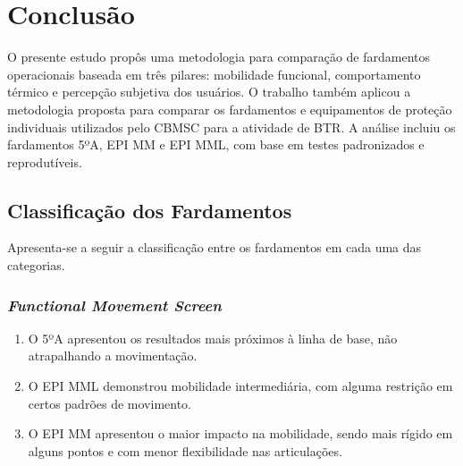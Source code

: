 \chapter{Conclusão}
    O presente estudo propôs uma metodologia para comparação de fardamentos operacionais baseada 
    em três pilares: mobilidade funcional, comportamento térmico e percepção subjetiva dos usuários.
    O trabalho também aplicou a metodologia proposta para comparar os fardamentos e equipamentos de 
    proteção individuais utilizados pelo \acrshort{CBMSC} para a atividade de \acrlong{BTR}. A análise incluiu os fardamentos 5ºA, 
    EPI \acrlong{MM} e EPI \acrlong{MML}, com base em testes padronizados e reprodutíveis.
    
    \section{Classificação dos Fardamentos}
        Apresenta-se a seguir a classificação entre os fardamentos em cada uma das categorias.
        \subsection{\textit{Functional Movement Screen}}
            \begin{enumerate}[label=\Roman*.] %
                \item O 5ºA apresentou os resultados mais próximos à linha de base, não atrapalhando a 
                movimentação.
                \item O \acrshort{EPI} \acrlong{MML} demonstrou mobilidade intermediária, com alguma
                restrição em certos padrões de movimento.
                \item O \acrshort{EPI} \acrlong{MM} apresentou o maior impacto na mobilidade, sendo 
                mais rígido em alguns pontos e com menor flexibilidade nas articulações.
                \end{enumerate}

